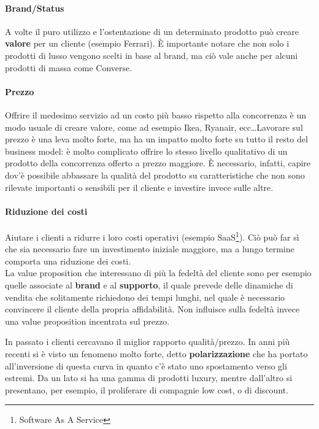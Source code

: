 \paragraph*{Brand/Status} A volte il puro utilizzo e l'ostentazione di un
determinato prodotto può creare \textbf{valore} per un cliente (esempio
Ferrari). È importante notare che non solo i prodotti di lusso vengono scelti
in base al brand, ma ciò vale anche per alcuni prodotti di massa come Converse.

\paragraph*{Prezzo} Offrire il medesimo servizio ad un costo più basso rispetto
alla concorrenza è un modo usuale di creare valore, come ad esempio Ikea,
Ryanair, ecc\dots Lavorare sul prezzo è una leva molto forte, ma ha un impatto
molto forte su tutto il resto del business model: è molto complicato offrire lo
stesso livello qualitativo di un prodotto della concorrenza offerto a prezzo
maggiore. È necessario, infatti, capire dov'è possibile abbassare la qualità
del prodotto su caratteristiche che non sono rilevate importanti o sensibili
per il cliente e investire invece sulle altre.

\paragraph*{Riduzione dei costi} Aiutare i clienti a ridurre i loro costi
operativi (esempio SaaS\footnote{Software As A Service}). Ciò può far sì che
sia necessario fare un investimento iniziale maggiore, ma a lungo termine
comporta una riduzione dei costi.\\[0.3cm]

La value proposition che interessano di più la fedeltà del cliente sono per
esempio quelle associate al \textbf{brand} e al \textbf{supporto}, il quale
prevede delle dinamiche di vendita che solitamente richiedono dei tempi lunghi,
nel quale è necessario convincere il cliente della propria affidabilità. Non
influisce sulla fedeltà invece una value proposition incentrata sul prezzo.

\noindent In passato i clienti cercavano il miglior rapporto qualità/prezzo. In
anni più recenti si è visto un fenomeno molto forte, detto
\textbf{polarizzazione} che ha portato all'inversione di questa curva
 in quanto c'è stato uno spostamento verso
gli estremi. Da un lato si ha una gamma di prodotti luxury, mentre dall'altro
si presentano, per esempio, il proliferare di compagnie low cost, o di discount.

